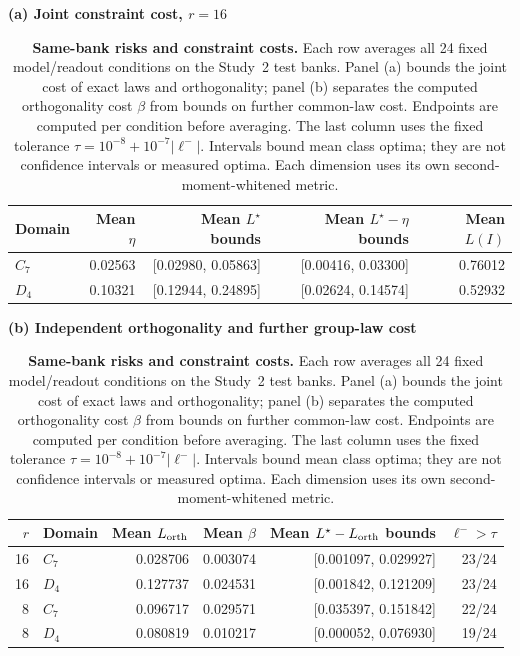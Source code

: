 \begin{table}[t]
\centering\small
\setlength{\tabcolsep}{4pt}
\textbf{(a) Joint constraint cost, $r=16$}\par\smallskip
\begin{tabular}{@{}lrrrr@{}}
\toprule
Domain & Mean $\eta$ & Mean $L^\star$ bounds & Mean $L^\star-\eta$ bounds & Mean $L(I)$ \\
\midrule
$C_7$ & 0.02563 & [0.02980, 0.05863] & [0.00416, 0.03300] & 0.76012 \\
$D_4$ & 0.10321 & [0.12944, 0.24895] & [0.02624, 0.14574] & 0.52932 \\
\bottomrule
\end{tabular}
\par\medskip
\textbf{(b) Independent orthogonality and further group-law cost}\par\smallskip
\begin{tabular}{@{}rlrrrr@{}}
\toprule
$r$ & Domain & Mean $L_{\rm orth}$ & Mean $\beta$ & Mean $L^\star-L_{\rm orth}$ bounds & $\ell^->\tau$ \\
\midrule
16 & $C_7$ & 0.028706 & 0.003074 & [0.001097, 0.029927] & 23/24 \\
16 & $D_4$ & 0.127737 & 0.024531 & [0.001842, 0.121209] & 23/24 \\
8 & $C_7$ & 0.096717 & 0.029571 & [0.035397, 0.151842] & 22/24 \\
8 & $D_4$ & 0.080819 & 0.010217 & [0.000052, 0.076930] & 19/24 \\
\bottomrule
\end{tabular}
\caption{\textbf{Same-bank risks and constraint costs.} Each row averages all 24 fixed model/readout conditions on the Study~2 test banks. Panel (a) bounds the joint cost of exact laws and orthogonality; panel (b) separates the computed orthogonality cost $\beta$ from bounds on further common-law cost. Endpoints are computed per condition before averaging. The last column uses the fixed tolerance $\tau=10^{-8}+10^{-7}|\ell^-|$. Intervals bound mean class optima; they are not confidence intervals or measured optima. Each dimension uses its own second-moment-whitened metric.}
\label{tab:core-risk-summary}
\end{table}
